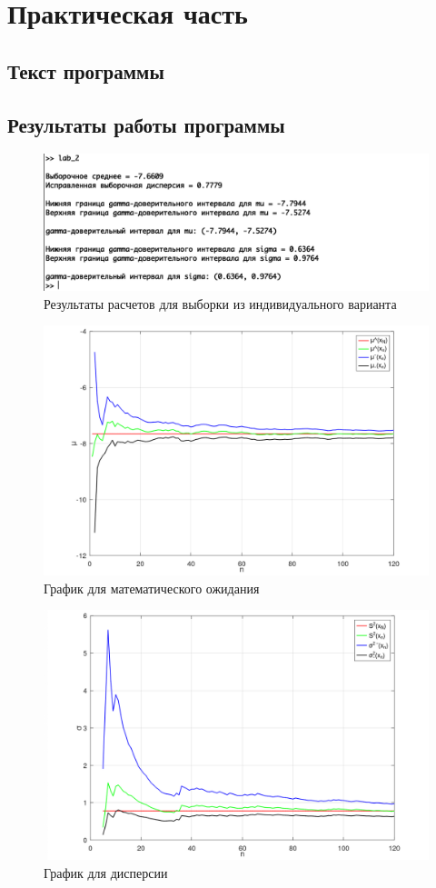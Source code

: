 \documentclass[a4paper,14pt, unknownkeysallowed]{extreport}
\begin{document}
\chapter{Практическая часть}

\section{Текст программы}



\section{Результаты работы программы}

\begin{figure}[h]
	\centering
	\includegraphics[scale=1]{img/result.png}
	\caption{Результаты расчетов для выборки из индивидуального варианта}   
	\label{fig:result}
\end{figure}

\begin{figure}[h]
	\centering
	\includegraphics[scale=0.9]{img/mu.png}
	\caption{График для математического ожидания}
	\label{fig:mu}
\end{figure}

\begin{figure}[h]
	\centering
	\includegraphics[scale=0.9]{img/sigma.png}
	\caption{График для дисперсии}
	\label{fig:sigma}
\end{figure}
\end{document}
